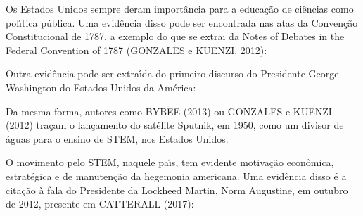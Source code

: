 \documentclass[
12pt,		%
openright,	%
twoside,  %
a4paper,			%
chapter=TITLE,		%
english,			%
french,				%
spanish,			%
brazil				%
]{USPSC-classe/USPSC}
\begin{document}
Os Estados Unidos sempre deram import\^ancia para a educa\c{c}\~ao de ci\^encias como pol\'{\i}tica p\'ublica. Uma evid\^encia disso pode ser encontrada nas atas da Conven\c{c}\~ao Constitucional de 1787, a exemplo do que se extrai da \textquotedbl Notes of Debates in the Federal Convention of 1787  (GONZALES e KUENZI, 2012):










\noindent\begin{center}\mbox{\centering{}}\end{center}


Outra evid\^encia pode ser extra\'{\i}da do primeiro discurso do Presidente George Washington do Estados Unidos da Am\'erica:










\noindent\begin{center}\mbox{\centering{}}\end{center}


Da mesma forma, autores como  BYBEE (2013)  ou  GONZALES e KUENZI (2012) tra\c{c}am o lan\c{c}amento do sat\'elite Sputnik, em 1950, como um divisor de \'aguas para o ensino de STEM, nos Estados Unidos.









O movimento pelo STEM, naquele pa\'{\i}s, tem evidente motiva\c{c}\~ao econ\^omica, estrat\'egica e de manuten\c{c}\~ao da hegemonia americana. Uma evid\^encia disso \'e a cita\c{c}\~ao \`a fala do Presidente da Lockheed Martin, Norm Augustine, em outubro de 2012, presente em  CATTERALL (2017):
\end{document}
